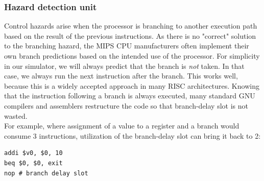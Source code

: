 \subsubsection{Hazard detection unit}
Control hazards arise when the processor is branching to another execution path
based on the result of the previous instructions. As there is no "correct"
solution to the branching hazard, the MIPS CPU manufacturers often implement
their own branch predictions based on the intended use of the processor. For
simplicity in our simulator, we will always predict that the branch is
\textit{not} taken. In that case, we always run the next instruction after the
branch. This works well, because this is a widely accepted approach in many
RISC architectures\cite{wiki:branch_delay_slots}.  Knowing that the instruction
following a branch is always executed, many standard GNU compilers and assemblers
restructure the code so that branch-delay slot is not wasted.\\
For example, where assignment of a value to a register and a branch would
consume 3 instructions, utilization of the branch-delay slot can bring it back
to 2:
\begin{lstlisting}
addi $v0, $0, 10
beq $0, $0, exit
nop # branch delay slot
\end{lstlisting}

